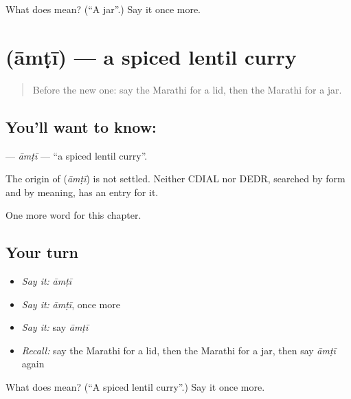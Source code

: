 \begin{tcolorbox}[breakable,colback=teal!4,colframe=teal!35!black,title={Before you move on}]
What does  mean? (\textquotedblleft{}A jar\textquotedblright{}.) Say it once more.
\end{tcolorbox}
\section[\texorpdfstring{\mr{आमटी} (āmṭī)}{आमटी (āmṭī)}]{ (āmṭī) — a spiced lentil curry}

\label{lesson:MR-C269-amti}



\begin{quote}
Before the new one: say the Marathi for a lid, then the Marathi for a jar.
\end{quote}

\subsection*{You'll want to know: }
\textbf{} — \emph{āmṭī} — \textquotedblleft{}a spiced lentil curry\textquotedblright{}.

\begin{cousinweb}
The origin of \textbf{} (\emph{āmṭī}) is not settled. Neither CDIAL nor DEDR, searched by form and by meaning, has an entry for it.
\end{cousinweb}

\begin{grammarlens}[title={What you've built}]
One more word for this chapter.
\end{grammarlens}

\subsection*{Your turn}
\begin{itemize}
\raggedright
  \item \emph{Say it:} \emph{āmṭī}
  \item \emph{Say it:} \emph{āmṭī}, once more
  \item \emph{Say it:} say \emph{āmṭī}
  \item \emph{Recall:} say the Marathi for a lid, then the Marathi for a jar, then say \emph{āmṭī} again
\end{itemize}

\begin{tcolorbox}[breakable,colback=teal!4,colframe=teal!35!black,title={Before you move on}]
What does  mean? (\textquotedblleft{}A spiced lentil curry\textquotedblright{}.) Say it once more.
\end{tcolorbox}
